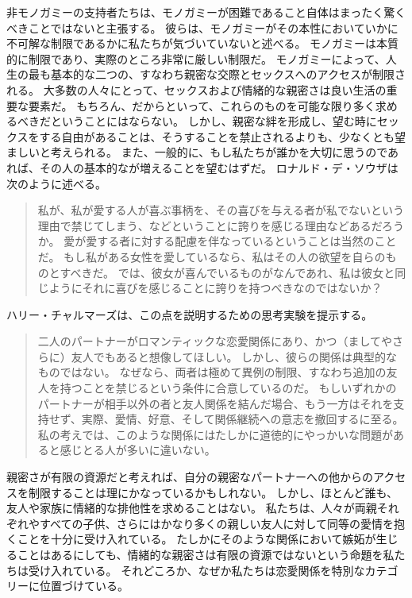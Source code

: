 \documentclass[paper=a4,book,openany]{jlreq}
\begin{document}
非モノガミーの支持者たちは、モノガミーが困難であること自体はまったく驚くべきことではないと主張する。
彼らは、モノガミーがその本性においていかに不可解な制限であるかに私たちが気づいていないと述べる。
モノガミーは本質的に制限であり、実際のところ非常に厳しい制限だ。
モノガミーによって、人生の最も基本的な二つの、すなわち親密な交際とセックスへのアクセスが制限される。
大多数の人々にとって、セックスおよび情緒的な親密さは良い生活の重要な要素だ。
もちろん、だからといって、これらのものを可能な限り多く求めるべきだということにはならない。
しかし、親密な絆を形成し、望む時にセックスをする自由があることは、そうすることを禁止されるよりも、少なくとも望ましいと考えられる。
また、一般的に、もし私たちが誰かを大切に思うのであれば、その人の基本的なが増えることを望むはずだ。
ロナルド・デ・ソウザは次のように述べる。

\begin{quote}

私が、私が愛する人が喜ぶ事柄を、その喜びを与える者が私でないという理由で禁じてしまう、などということに誇りを感じる理由などあるだろうか。
愛が愛する者に対する配慮を伴なっているということは当然のことだ。
もし私がある女性を愛しているなら、私はその人の欲望を自らのものとすべきだ。
では、彼女が喜んでいるものがなんであれ、私は彼女と同じようにそれに喜びを感じることに誇りを持つべきなのではないか？ \citep{sousa18:_how_think_yours_out_jealous}
\end{quote}

ハリー・チャルマーズは、この点を説明するための思考実験を提示する。

\begin{quote}

二人のパートナーがロマンティックな恋愛関係にあり、かつ（ましてやさらに）友人でもあると想像してほしい。
しかし、彼らの関係は典型的なものではない。
なぜなら、両者は極めて異例の制限、すなわち追加の友人を持つことを禁じるという条件に合意しているのだ。
もしいずれかのパートナーが相手以外の者と友人関係を結んだ場合、もう一方はそれを支持せず、実際、愛情、好意、そして関係継続への意志を撤回するに至る。
私の考えでは、このような関係にはたしかに道徳的にやっかいな問題があると感じとる人が多いに違いない。
\citep[p.225]{chalmers19:_is_monog_moral_permis}
\end{quote}

親密さが有限の資源だと考えれば、自分の親密なパートナーへの他からのアクセスを制限することは理にかなっているかもしれない。
しかし、ほとんど誰も、友人や家族に情緒的な排他性を求めることはない。
私たちは、人々が両親それぞれやすべての子供、さらにはかなり多くの親しい友人に対して同等の愛情を抱くことを十分に受け入れている。
たしかにそのような関係において嫉妬が生じることはあるにしても、情緒的な親密さは有限の資源ではないという命題を私たちは受け入れている。
それどころか、なぜか私たちは恋愛関係を特別なカテゴリーに位置づけている。
\end{document}
